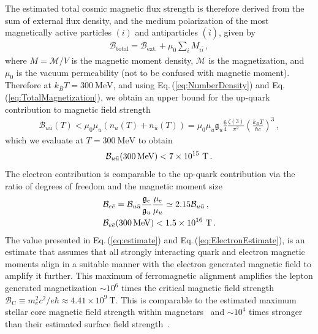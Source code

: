 \documentclass[epjST]{svjour}
\newcommand*{\MeV}{\text{\,MeV}}
\newcommand{\req}[1]{Eq.\,(\ref{#1})}
\begin{document}
The estimated total cosmic magnetic flux strength is therefore derived from the sum of external flux density, and the medium polarization of the most magnetically active particles \((i)\) and antiparticles \((\bar{i})\), given by
\begin{align}
\label{eq:TotalMagnetization}
\mathcal{B}_\mathrm{total}=\mathcal{B}_\mathrm{ext.}+\mu_{0}\sum_{i} M_{i\bar{i}}\,,
\end{align}
where \(M=\mathcal{M}/V\) is the magnetic moment density, \(\mathcal{M}\) is the magnetization, and \(\mu_{0}\) is the vacuum permeability (not to be confused with magnetic moment). {\color{blue}Therefore at \(k_{B}T=300~\mathrm{MeV}\), and using \req{eq:NumberDensity} and \req{eq:TotalMagnetization}, we obtain an upper bound for the up-quark contribution to magnetic field strength
\begin{align}
\label{eq:QuarkMagnetization}
\mathcal{B}_{u\bar{u}}(T)<\mu_{0}\mu_{u}(n_{u}(T)+n_{\bar{u}}(T))=\mu_{0}\mu_{u}\mathfrak{g}_{u}\frac{6}{4}\frac{\zeta(3)}{\pi^{2}}\left(\frac{k_{B}T}{\hbar c}\right)^{3}\,,
\end{align}
which we evaluate at \(T=300~\mathrm{MeV}\) to obtain
\begin{equation}
\label{eq:estimate}
\mathcal{B}_{u\bar{u}}(300\MeV) < 7\times10^{15}~\mathrm{T} \,.
\end{equation}
The electron contribution is comparable to the up-quark contribution via the ratio of degrees of freedom and the magnetic moment size
\begin{align}
\label{eq:ElectronMagnetization}
&\mathcal{B}_{e\bar{e}} = \mathcal{B}_{u\bar{u}}\frac{\mathfrak{g}_{e}}{\mathfrak{g}_{u}} \frac{\mu_{e}}{\mu_{u}} \simeq 2.15 \mathcal{B}_{u\bar{u}}\,,\\
\label{eq:ElectronEstimate}
&\mathcal{B}_{e\bar{e}}(300\MeV) < 1.5\times10^{16}~\mathrm{T}\,.
\end{align}
The value presented in \req{eq:estimate} and \req{eq:ElectronEstimate}, is an estimate that assumes} that all strongly interacting quark and electron magnetic moments align in a suitable manner with the electron generated magnetic field to amplify it further. This maximum of ferromagnetic alignment amplifies the lepton generated magnetization \(\sim 10^{6}\) times the critical magnetic field strength \(\mathcal{B}_\mathrm{C}\equiv m_{e}^{2}c^{2}/e\hbar\approx 4.41\times10^{9}\ \mathrm{T}\). This is comparable to the estimated maximum stellar core magnetic field strength within magnetars~\cite{Ferrer:2010wz} and \(\sim 10^{4}\) times stronger than their estimated surface field strength~\cite{Kaspi:2017fwg}.
\end{document}
